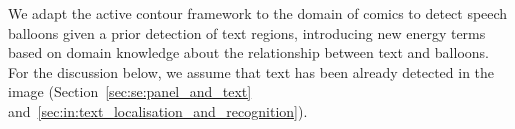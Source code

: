 


We adapt the active contour framework to the domain of comics to detect speech balloons given a prior detection of text regions, introducing new energy terms based on domain knowledge about the relationship between text and balloons.
For the discussion below, we assume that text has been already detected in the image (Section~\ref{sec:se:panel_and_text} and~\ref{sec:in:text_localisation_and_recognition}).%

